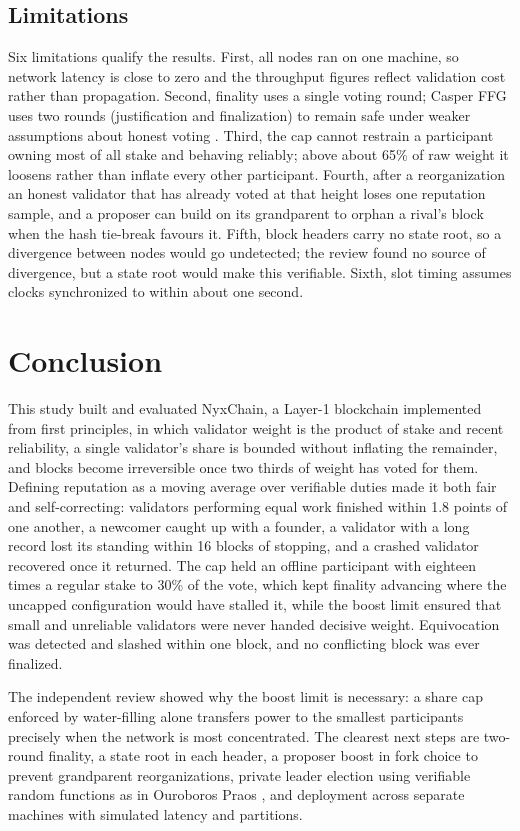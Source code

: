 \documentclass[conference]{IEEEtran}
\begin{document}
\subsection{Limitations}
Six limitations qualify the results. First, all nodes ran on one machine, so network latency is close to zero and the throughput figures reflect validation cost rather than propagation. Second, finality uses a single voting round; Casper FFG uses two rounds (justification and finalization) to remain safe under weaker assumptions about honest voting \cite{buterin2017}. Third, the cap cannot restrain a participant owning most of all stake and behaving reliably; above about 65\% of raw weight it loosens rather than inflate every other participant. Fourth, after a reorganization an honest validator that has already voted at that height loses one reputation sample, and a proposer can build on its grandparent to orphan a rival's block when the hash tie-break favours it. Fifth, block headers carry no state root, so a divergence between nodes would go undetected; the review found no source of divergence, but a state root would make this verifiable. Sixth, slot timing assumes clocks synchronized to within about one second.

\section{Conclusion}
This study built and evaluated NyxChain, a Layer-1 blockchain implemented from first principles, in which validator weight is the product of stake and recent reliability, a single validator's share is bounded without inflating the remainder, and blocks become irreversible once two thirds of weight has voted for them. Defining reputation as a moving average over verifiable duties made it both fair and self-correcting: validators performing equal work finished within 1.8 points of one another, a newcomer caught up with a founder, a validator with a long record lost its standing within 16 blocks of stopping, and a crashed validator recovered once it returned. The cap held an offline participant with eighteen times a regular stake to 30\% of the vote, which kept finality advancing where the uncapped configuration would have stalled it, while the boost limit ensured that small and unreliable validators were never handed decisive weight. Equivocation was detected and slashed within one block, and no conflicting block was ever finalized.

The independent review showed why the boost limit is necessary: a share cap enforced by water-filling alone transfers power to the smallest participants precisely when the network is most concentrated. The clearest next steps are two-round finality, a state root in each header, a proposer boost in fork choice to prevent grandparent reorganizations, private leader election using verifiable random functions as in Ouroboros Praos \cite{david2018}, and deployment across separate machines with simulated latency and partitions.
\end{document}
